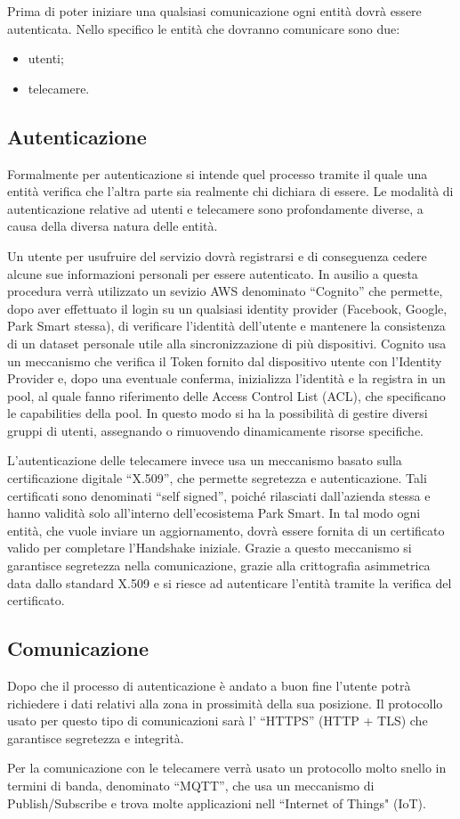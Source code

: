 Prima di poter iniziare una qualsiasi comunicazione ogni entità dovrà essere autenticata. Nello specifico le entità che dovranno comunicare sono due:

\begin{itemize}
	\item utenti;
	\item telecamere.
\end{itemize}

\subsection*{Autenticazione} 
Formalmente per autenticazione si intende quel processo tramite il quale una entità verifica che l'altra parte sia realmente chi dichiara di essere.
Le modalità di autenticazione relative ad utenti e telecamere sono profondamente diverse, a causa della diversa natura delle entità. 

Un utente per usufruire del servizio dovrà registrarsi e di conseguenza cedere alcune sue informazioni personali per essere autenticato. 
In ausilio a questa procedura verrà utilizzato un sevizio AWS denominato ``Cognito'' che permette, dopo aver effettuato il login su un qualsiasi identity provider (Facebook, Google, Park Smart stessa), di verificare l'identità dell'utente e mantenere la consistenza di un dataset personale utile alla sincronizzazione di più dispositivi. 
Cognito usa un meccanismo che verifica il Token fornito dal dispositivo utente con l'Identity Provider e, dopo una eventuale conferma, inizializza l'identità e la registra in un pool, al quale fanno riferimento delle Access Control List (ACL), che specificano le capabilities della pool. In questo modo si ha la possibilità di gestire diversi gruppi di utenti, assegnando o rimuovendo dinamicamente risorse specifiche.

L'autenticazione delle telecamere invece usa un meccanismo basato sulla certificazione digitale ``X.509'', che permette segretezza e autenticazione. Tali certificati sono denominati ``self signed'', poiché rilasciati dall'azienda stessa e hanno validità solo all'interno dell'ecosistema Park Smart. 
In tal modo ogni entità, che vuole inviare un aggiornamento, dovrà essere fornita di un certificato valido per completare l'Handshake iniziale. 
Grazie a questo meccanismo si garantisce segretezza nella comunicazione, grazie alla crittografia asimmetrica data dallo standard X.509 e si riesce ad autenticare l'entità tramite la verifica del certificato.

\subsection*{Comunicazione}
Dopo che il processo di autenticazione è andato a buon fine l'utente potrà richiedere i dati relativi alla zona in prossimità della sua posizione. Il protocollo usato per questo tipo di comunicazioni sarà l' ``HTTPS'' (HTTP + TLS) che garantisce segretezza e integrità.

Per la comunicazione con le telecamere verrà usato un protocollo molto snello in termini di banda, denominato ``MQTT'', che usa un meccanismo di Publish/Subscribe e trova molte applicazioni nell ``Internet of Things" (IoT).
